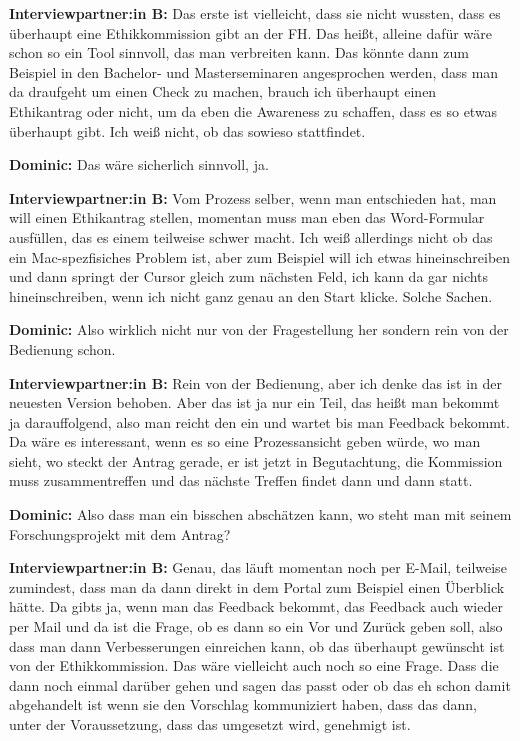 \documentclass[a4paper,12pt,twoside,numbers=noendperiod]{scrreprt}
\begin{document}
\textbf{Interviewpartner:in B:} Das erste ist vielleicht, dass sie nicht wussten, dass es überhaupt eine Ethikkommission gibt an der FH. Das heißt, alleine dafür wäre schon so ein Tool sinnvoll, das man verbreiten kann. Das könnte dann zum Beispiel in den Bachelor- und Masterseminaren angesprochen werden, dass man da draufgeht um einen Check zu machen, brauch ich überhaupt einen Ethikantrag oder nicht, um da eben die Awareness zu schaffen, dass es so etwas überhaupt gibt. Ich weiß nicht, ob das sowieso stattfindet.

\textbf{Dominic:} Das wäre sicherlich sinnvoll, ja.

\textbf{Interviewpartner:in B:} Vom Prozess selber, wenn man entschieden hat, man will einen Ethikantrag stellen, momentan muss man eben das Word-Formular ausfüllen, das es einem teilweise schwer macht. Ich weiß allerdings nicht ob das ein Mac-spezfisiches Problem ist, aber zum Beispiel will ich etwas hineinschreiben und dann springt der Cursor gleich zum nächsten Feld, ich kann da gar nichts hineinschreiben, wenn ich nicht ganz genau an den Start klicke. Solche Sachen.

\textbf{Dominic:} Also wirklich nicht nur von der Fragestellung her sondern rein von der Bedienung schon.

\textbf{Interviewpartner:in B:} Rein von der Bedienung, aber ich denke das ist in der neuesten Version behoben. Aber das ist ja nur ein Teil, das heißt man bekommt ja darauffolgend, also man reicht den ein und wartet bis man Feedback bekommt. Da wäre es interessant, wenn es so eine Prozessansicht geben würde, wo man sieht, wo steckt der Antrag gerade, er ist jetzt in Begutachtung, die Kommission muss zusammentreffen und das nächste Treffen findet dann und dann statt.

\textbf{Dominic:} Also dass man ein bisschen abschätzen kann, wo steht man mit seinem Forschungsprojekt mit dem Antrag?

\textbf{Interviewpartner:in B:} Genau, das läuft momentan noch per E-Mail, teilweise zumindest, dass man da dann direkt in dem Portal zum Beispiel einen Überblick hätte. Da gibts ja, wenn man das Feedback bekommt, das Feedback auch wieder per Mail und da ist die Frage, ob es dann so ein Vor und Zurück geben soll, also dass man dann Verbesserungen einreichen kann, ob das überhaupt gewünscht ist von der Ethikkommission. Das wäre vielleicht auch noch so eine Frage. Dass die dann noch einmal darüber gehen und sagen das passt oder ob das eh schon damit abgehandelt ist wenn sie den Vorschlag kommuniziert haben, dass das dann, unter der Voraussetzung, dass das umgesetzt wird, genehmigt ist.
\end{document}
